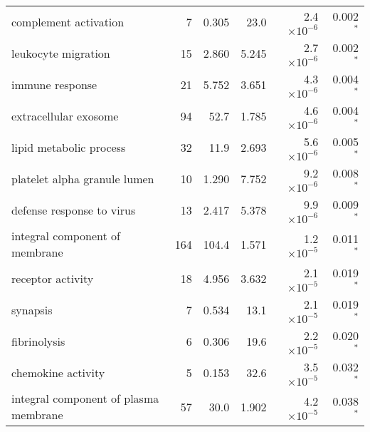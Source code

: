 \begin{longtable}{|l|r|r|r|r|r|}
                             complement activation &                       7 &                   0.305 &       23.0 &  2.4$\times 10^{-6}$ &                0.002$\bm{^*}$ \\
                               leukocyte migration &                      15 &                   2.860 &      5.245 &  2.7$\times 10^{-6}$ &                0.002$\bm{^*}$ \\
                                   immune response &                      21 &                   5.752 &      3.651 &  4.3$\times 10^{-6}$ &                0.004$\bm{^*}$ \\
                             extracellular exosome &                      94 &                    52.7 &      1.785 &  4.6$\times 10^{-6}$ &                0.004$\bm{^*}$ \\
                           lipid metabolic process &                      32 &                    11.9 &      2.693 &  5.6$\times 10^{-6}$ &                0.005$\bm{^*}$ \\
                      platelet alpha granule lumen &                      10 &                   1.290 &      7.752 &  9.2$\times 10^{-6}$ &                0.008$\bm{^*}$ \\
                         defense response to virus &                      13 &                   2.417 &      5.378 &  9.9$\times 10^{-6}$ &                0.009$\bm{^*}$ \\
                    integral component of membrane &                     164 &                   104.4 &      1.571 &  1.2$\times 10^{-5}$ &                0.011$\bm{^*}$ \\
                                 receptor activity &                      18 &                   4.956 &      3.632 &  2.1$\times 10^{-5}$ &                0.019$\bm{^*}$ \\
                                          synapsis &                       7 &                   0.534 &       13.1 &  2.1$\times 10^{-5}$ &                0.019$\bm{^*}$ \\
                                      fibrinolysis &                       6 &                   0.306 &       19.6 &  2.2$\times 10^{-5}$ &                0.020$\bm{^*}$ \\
                                chemokine activity &                       5 &                   0.153 &       32.6 &  3.5$\times 10^{-5}$ &                0.032$\bm{^*}$ \\
             integral component of plasma membrane &                      57 &                    30.0 &      1.902 &  4.2$\times 10^{-5}$ &                0.038$\bm{^*}$ \\

\end{longtable}
